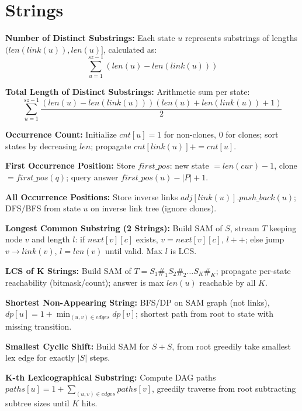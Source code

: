 \chapter{Strings}

\small %

\textbf{Number of Distinct Substrings:} Each state $u$ represents substrings of lengths $(len(link(u)), len(u)]$, calculated as:
\[
\sum_{u=1}^{sz-1} (len(u) - len(link(u)))
\]

\textbf{Total Length of Distinct Substrings:} Arithmetic sum per state:
\[
\sum_{u=1}^{sz-1} \frac{(len(u) - len(link(u)))(len(u) + len(link(u)) + 1)}{2}
\]

\textbf{Occurrence Count:} Initialize $cnt[u] = 1$ for non-clones, $0$ for clones; sort states by decreasing $len$; propagate $cnt[link(u)] += cnt[u]$.

\textbf{First Occurrence Position:} Store $first\_pos$: new state $= len(cur) - 1$, clone $= first\_pos(q)$; query answer $first\_pos(u) - |P| + 1$.

\textbf{All Occurrence Positions:} Store inverse links $adj[link(u)].push\_back(u)$; DFS/BFS from state $u$ on inverse link tree (ignore clones).

\textbf{Longest Common Substring (2 Strings):} Build SAM of $S$, stream $T$ keeping node $v$ and length $l$: if $next[v][c]$ exists, $v = next[v][c]$, $l++$; else jump $v \to link(v)$, $l = len(v)$ until valid. Max $l$ is LCS.

\textbf{LCS of K Strings:} Build SAM of $T = S_1\#_1S_2\#_2 \dots S_K\#_K$; propagate per-state reachability (bitmask/count); answer is max $len(u)$ reachable by all $K$.

\textbf{Shortest Non-Appearing String:} BFS/DP on SAM graph (not links), $dp[u] = 1 + \min_{(u,v) \in edges} dp[v]$; shortest path from root to state with missing transition.

\textbf{Smallest Cyclic Shift:} Build SAM for $S + S$, from root greedily take smallest lex edge for exactly $|S|$ steps.

\textbf{K-th Lexicographical Substring:} Compute DAG paths $paths[u] = 1 + \sum_{(u,v) \in edges} paths[v]$, greedily traverse from root subtracting subtree sizes until $K$ hits.

\normalsize %
